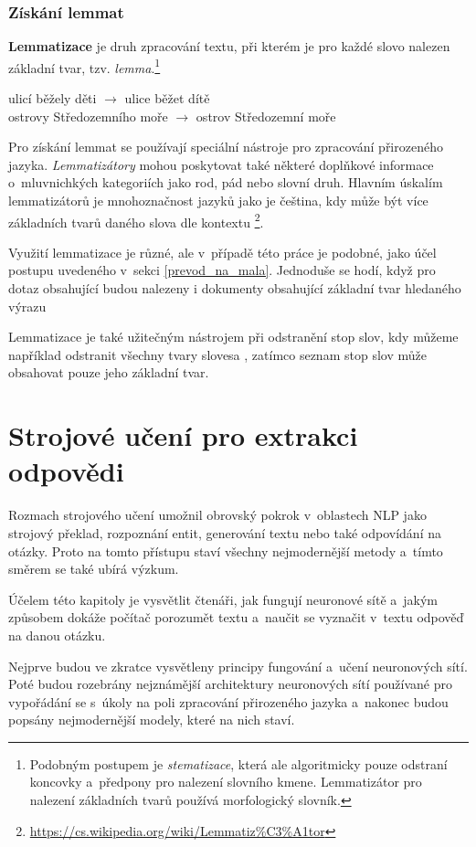 \subsection{Získání lemmat}
\textbf{Lemmatizace} je druh zpracování textu, při kterém je pro každé slovo nalezen základní tvar, tzv. \emph{lemma}.\footnote{Podobným postupem je \emph{stematizace}, která ale algoritmicky pouze odstraní koncovky a~předpony pro nalezení slovního kmene. Lemmatizátor pro nalezení základních tvarů používá morfologický slovník.}
\begin{center}
    ulicí běžely děti $\longrightarrow$ ulice běžet dítě\\
    ostrovy Středozemního moře $\longrightarrow$ ostrov Středozemní moře
\end{center}
Pro získání lemmat se používají speciální nástroje pro zpracování přirozeného jazyka. \emph{Lemma\-tizátory} mohou poskytovat také některé doplňkové informace o~mluvnichkých kategoriích jako rod, pád nebo slovní druh. Hlavním úskalím lemmatizátorů je mnohoznačnost jazyků jako je čeština, kdy může být více základních tvarů daného slova dle kontextu \footnote{\url{https://cs.wikipedia.org/wiki/Lemmatiz\%C3\%A1tor}}.\par
Využití lemmatizace je různé, ale v~případě této práce je podobné, jako účel postupu uvedeného v~sekci \ref{prevod_na_mala}. Jednoduše se hodí, když pro dotaz obsahující  budou nalezeny i dokumenty obsahující základní tvar hledaného výrazu \par
Lemmatizace je také užitečným nástrojem při odstranění stop slov, kdy můžeme například odstranit všechny tvary slovesa , zatímco seznam stop slov může obsahovat pouze jeho základní tvar.



\chapter{Strojové učení pro extrakci odpovědi}
\label{language_comprehension}

Rozmach strojového učení umožnil obrovský pokrok v~oblastech NLP jako strojový překlad, rozpoznání entit, generování textu nebo také odpovídání na otázky. Proto na tomto přístupu staví všechny nejmodernější metody a~tímto směrem se také ubírá výzkum.\par
Účelem této kapitoly je vysvětlit čtenáři, jak fungují neuronové sítě a~jakým způsobem dokáže počítač porozumět textu a~naučit se vyznačit v~textu odpověď na danou otázku.\par
Nejprve budou ve zkratce vysvětleny principy fungování a~učení neuronových sítí. Poté budou rozebrány nejznámější architektury neuronových sítí používané pro vypořádání se s~úkoly na poli zpracování přirozeného jazyka a~nakonec budou popsány nejmodernější modely, které na nich staví.
\bigskip

